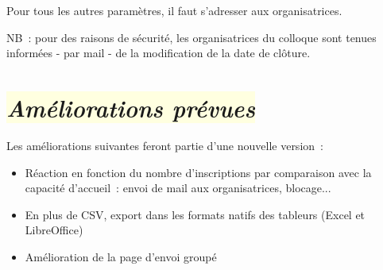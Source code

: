 \documentclass[10pt,a4paper]{article}
\newcommand{\jaunepale}[1]{\colorbox{LightYellow}{#1}}
\begin{document}
Pour tous les autres paramètres, il faut s'adresser aux organisatrices.

NB : pour des raisons de sécurité, les organisatrices du colloque sont tenues informées - par mail - de la modification de la date de clôture.

\section*{\jaunepale{\emph{Améliorations prévues}}}

Les améliorations suivantes feront partie d'une nouvelle version :

\begin{itemize}
  \item Réaction en fonction du nombre d'inscriptions par comparaison avec la capacité d'accueil : envoi de mail aux organisatrices, blocage...
  \item En plus de CSV, export dans les formats natifs des tableurs (Excel et LibreOffice)
  \item Amélioration de la page d'envoi groupé
\end{itemize}

 \hfill

\end{document}
